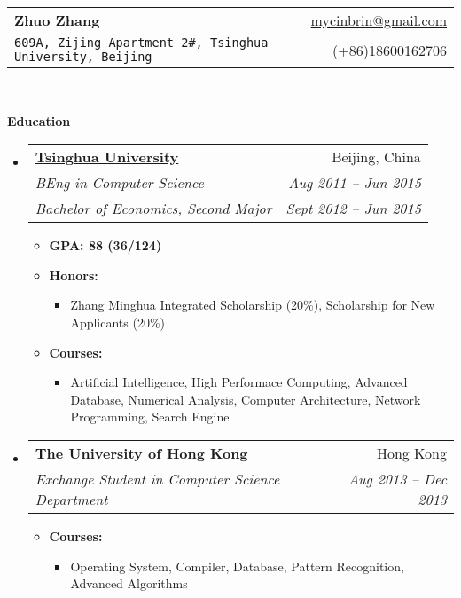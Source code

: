 \documentclass[letterpaper,11pt]{article}
\makeatletter
\newcommand{\resitem}[1]{\item #1 \vspace{-2pt}}
\newcommand{\resheading}[1]{{\large \colorbox{mygrey}{\begin{minipage}{\textwidth}{\textbf{#1 \vphantom{p\^{E}}}}\end{minipage}}}}
\newcommand{\ressubheading}[4]{
\begin{tabular*}{6.5in}{l@{\extracolsep{\fill}}r}
        \textbf{#1} & #2 \\
        \textit{#3} & \textit{#4} \\
\end{tabular*}\vspace{-6pt}}
\newcommand{\ressubheadingg}[6]{
\begin{tabular*}{6.5in}{l@{\extracolsep{\fill}}r}
        \textbf{#1} & #2 \\
        \textit{#3} & \textit{#4} \\
        \textit{#5} & \textit{#6} \\
\end{tabular*}\vspace{-6pt}}
\makeatother
\begin{document}
\newcommand{\mywebheader}{
\begin{tabular*}{7in}{l@{\extracolsep{\fill}}r}
    \textbf{{\LARGE Zhuo Zhang}} & \href{mailto:mycinbrin@gmail.com}{mycinbrin@gmail.com}\\
    {\footnotesize \texttt{609A, Zijing Apartment 2\#, Tsinghua University, Beijing}} & {(+86)18600162706}
    \end{tabular*}
\\
\vspace{0.1in}}

\mywebheader

\resheading{Education}
    \begin{itemize}
            \item
                \ressubheadingg{\href{http://www.tsinghua.edu.cn}{Tsinghua University}}{Beijing, China}{{BEng in Computer Science}}{Aug 2011 -- Jun 2015}{Bachelor of Economics, Second Major}{Sept 2012 -- Jun 2015}
                { \footnotesize
                \begin{itemize}
						\resitem{\textbf{GPA: 88 (36/124) }}
                        \resitem{\textbf{Honors:}} 
                        \begin{itemize}
                                \resitem{Zhang Minghua Integrated Scholarship (20\%), Scholarship for New Applicants (20\%) }
                        \end{itemize}
						\resitem{\textbf{Courses:}}
						\begin{itemize}
								\resitem{Artificial Intelligence, High Performace Computing, Advanced Database, Numerical Analysis, Computer Architecture, Network Programming, Search Engine}
						\end{itemize}
                \end{itemize}
                }
            \item
                \ressubheading{\href{http://www.hku.hku}{The University of Hong Kong}}{Hong Kong}{Exchange Student in Computer Science Department}{Aug 2013 -- Dec 2013}{}
                { \footnotesize
                \begin{itemize}
                      \resitem{\textbf{Courses:}}
                      \begin{itemize}
							  \resitem{Operating System, Compiler, Database, Pattern Recognition, Advanced Algorithms}
					  \end{itemize}
				\end{itemize}
			    }
    \end{itemize} %
\end{document}
